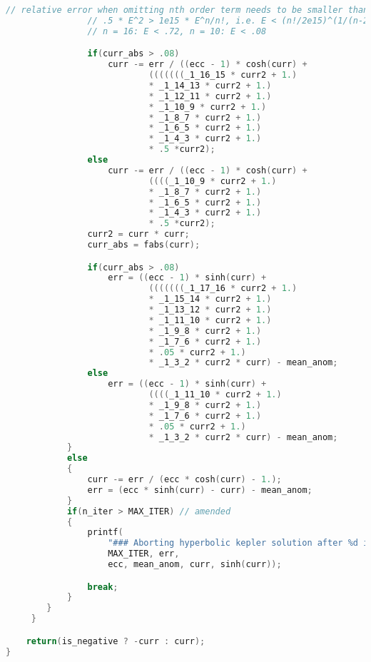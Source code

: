 \begin{lstlisting}[language=C]
                // relative error when omitting nth order term needs to be smaller than resolution 1.e-15:
                // .5 * E^2 > 1e15 * E^n/n!, i.e. E < (n!/2e15)^(1/(n-2))
                // n = 16: E < .72, n = 10: E < .08

                if(curr_abs > .08)
                    curr -= err / ((ecc - 1) * cosh(curr) +
                            (((((((_1_16_15 * curr2 + 1.)
                            * _1_14_13 * curr2 + 1.)
                            * _1_12_11 * curr2 + 1.)
                            * _1_10_9 * curr2 + 1.)
                            * _1_8_7 * curr2 + 1.)
                            * _1_6_5 * curr2 + 1.)
                            * _1_4_3 * curr2 + 1.)
                            * .5 *curr2);
                else
                    curr -= err / ((ecc - 1) * cosh(curr) +
                            ((((_1_10_9 * curr2 + 1.)
                            * _1_8_7 * curr2 + 1.)
                            * _1_6_5 * curr2 + 1.)
                            * _1_4_3 * curr2 + 1.)
                            * .5 *curr2);
                curr2 = curr * curr;
                curr_abs = fabs(curr);

                if(curr_abs > .08)
                    err = ((ecc - 1) * sinh(curr) +
                            (((((((_1_17_16 * curr2 + 1.)
                            * _1_15_14 * curr2 + 1.)
                            * _1_13_12 * curr2 + 1.)
                            * _1_11_10 * curr2 + 1.)
                            * _1_9_8 * curr2 + 1.)
                            * _1_7_6 * curr2 + 1.)
                            * .05 * curr2 + 1.)
                            * _1_3_2 * curr2 * curr) - mean_anom;
                else
                    err = ((ecc - 1) * sinh(curr) +
                            ((((_1_11_10 * curr2 + 1.)
                            * _1_9_8 * curr2 + 1.)
                            * _1_7_6 * curr2 + 1.)
                            * .05 * curr2 + 1.)
                            * _1_3_2 * curr2 * curr) - mean_anom;
            }
            else
            {
                curr -= err / (ecc * cosh(curr) - 1.);
                err = (ecc * sinh(curr) - curr) - mean_anom;
            }
            if(n_iter > MAX_ITER) // amended
            {
                printf(
                    "### Aborting hyperbolic kepler solution after %d iterations, keeping error of %e (e=%e, M=%e, E_=%1.12e, sinh(E_)=%1.12e)\n",
                    MAX_ITER, err,
                    ecc, mean_anom, curr, sinh(curr));

                break;
            }
        }
     }

    return(is_negative ? -curr : curr);
}
\end{lstlisting}

